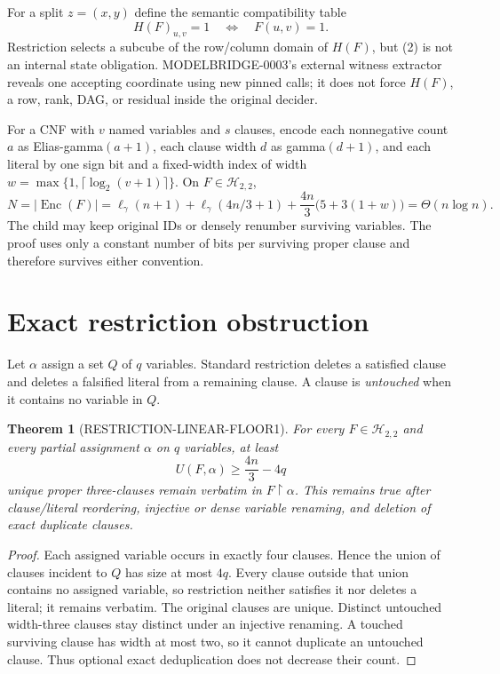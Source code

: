 \documentclass[11pt]{article}
\newtheorem{theorem}{Theorem}
\newcommand{\Enc}{\operatorname{Enc}}
\begin{document}
For a split $z=(x,y)$ define the semantic compatibility table
\[
 H(F)_{u,v}=1\quad\Longleftrightarrow\quad F(u,v)=1.
 \tag{2}
\]
Restriction selects a subcube of the row/column domain of $H(F)$, but (2) is
not an internal state obligation.  MODELBRIDGE-0003's external witness
extractor reveals one accepting coordinate using new pinned calls; it does
not force $H(F)$, a row, rank, DAG, or residual inside the original decider.

For a CNF with $v$ named variables and $s$ clauses, encode each nonnegative
count $a$ as Elias-gamma$(a+1)$, each clause width $d$ as
gamma$(d+1)$, and each literal by one sign bit and a fixed-width index of
width $w=\max\{1,\lceil\log_2(v+1)\rceil\}$.  On
$F\in\mathcal H_{2,2}$,
\[
 N=|\Enc(F)|
 =\ell_\gamma(n+1)+\ell_\gamma(4n/3+1)
   +\frac{4n}{3}\bigl(5+3(1+w)\bigr)
 =\Theta(n\log n).
 \tag{3}
\]
The child may keep original IDs or densely renumber surviving variables.
The proof uses only a constant number of bits per surviving proper clause
and therefore survives either convention.

\section{Exact restriction obstruction}
Let $\alpha$ assign a set $Q$ of $q$ variables.  Standard restriction
deletes a satisfied clause and deletes a falsified literal from a remaining
clause.  A clause is \emph{untouched} when it contains no variable in $Q$.

\begin{theorem}[RESTRICTION-LINEAR-FLOOR1]
For every $F\in\mathcal H_{2,2}$ and every partial assignment $\alpha$ on
$q$ variables, at least
\[
 U(F,\alpha)\ge \frac{4n}{3}-4q                           \tag{4}
\]
unique proper three-clauses remain verbatim in
$F\upharpoonright\alpha$.  This remains true after clause/literal
reordering, injective or dense variable renaming, and deletion of exact
duplicate clauses.
\end{theorem}
\begin{proof}
Each assigned variable occurs in exactly four clauses.  Hence the union of
clauses incident to $Q$ has size at most $4q$.  Every clause outside that
union contains no assigned variable, so restriction neither satisfies it nor
deletes a literal; it remains verbatim.  The original clauses are unique.
Distinct untouched width-three clauses stay distinct under an injective
renaming.  A touched surviving clause has width at most two, so it cannot
duplicate an untouched clause.  Thus optional exact deduplication does not
decrease their count.
\end{proof}
\end{document}
